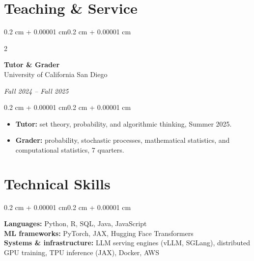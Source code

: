 \documentclass[10pt, letterpaper]{article}
\newenvironment{highlights}{
    \begin{itemize}[
        topsep=0.10 cm,
        parsep=0.10 cm,
        partopsep=0pt,
        itemsep=0pt,
        leftmargin=0.4 cm + 10pt
    ]
}{\end{itemize}}
\newenvironment{onecolentry}{
    \begin{adjustwidth}{0.2 cm + 0.00001 cm}{0.2 cm + 0.00001 cm}
}{\end{adjustwidth}}
\newenvironment{twocolentry}[2][]{
    \onecolentry
    \def\secondColumn{#2}
    \setcolumnwidth{\fill, 4.5 cm}
    \begin{paracol}{2}
}{
    \switchcolumn \raggedleft \secondColumn
    \end{paracol}
    \endonecolentry
}
\begin{document}
    \section{Teaching \& Service}

    \begin{twocolentry}{\textit{Fall 2024 -- Fall 2025}}
        \textbf{Tutor \& Grader}\\
        University of California San Diego
    \end{twocolentry}

    \vspace{0.10 cm}
    \begin{onecolentry}
        \begin{highlights}
            \item \textbf{Tutor:} set theory, probability, and algorithmic thinking, Summer 2025.
            \item \textbf{Grader:} probability, stochastic processes, mathematical statistics, and computational statistics, 7 quarters.
        \end{highlights}
    \end{onecolentry}

    \section{Technical Skills}

    \begin{onecolentry}
        \textbf{Languages:} Python, R, SQL, Java, JavaScript\\[2pt]
        \textbf{ML frameworks:} PyTorch, JAX, Hugging Face Transformers\\[2pt]
        \textbf{Systems \& infrastructure:} LLM serving engines (vLLM, SGLang), distributed GPU training, TPU inference (JAX), Docker, AWS
    \end{onecolentry}
\end{document}
